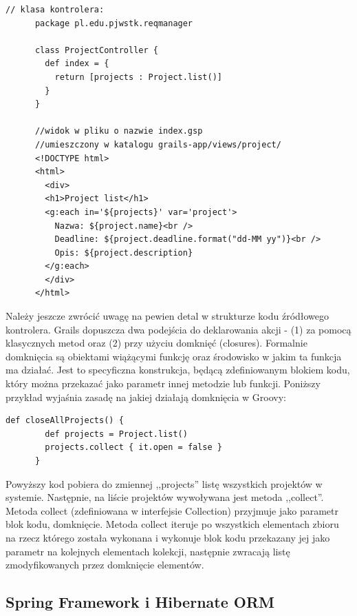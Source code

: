     \begin{lstlisting}[caption={widok i kontroler}, label={lst:contView}]
      // klasa kontrolera:
      package pl.edu.pjwstk.reqmanager

      class ProjectController {
        def index = { 
          return [projects : Project.list()]
        }   
      }

      //widok w pliku o nazwie index.gsp 
      //umieszczony w katalogu grails-app/views/project/
      <!DOCTYPE html>
      <html>
        <div>
        <h1>Project list</h1>
        <g:each in='${projects}' var='project'>
          Nazwa: ${project.name}<br />
          Deadline: ${project.deadline.format("dd-MM yy")}<br />
          Opis: ${project.description} 
        </g:each>
        </div>
      </html>

    \end{lstlisting}

    Należy jeszcze zwrócić uwagę na pewien detal w strukturze kodu źródłowego kontrolera. Grails dopuszcza dwa podejścia do deklarowania akcji - (1) za pomocą klasycznych metod oraz (2) przy użyciu domknięć (closures). Formalnie domknięcia są obiektami wiążącymi funkcję oraz środowisko w jakim ta funkcja ma działać. Jest to specyficzna konstrukcja, będącą zdefiniowanym blokiem kodu, który można przekazać jako parametr innej metodzie lub funkcji. Poniższy przykład wyjaśnia zasadę na jakiej działają domknięcia w Groovy: 
    
    \begin{lstlisting}[caption={domknięcie w Groovy}, label={lst:closure}]
      def closeAllProjects() {
        def projects = Project.list()
        projects.collect { it.open = false }
      }
    \end{lstlisting} 
    
    Powyższy kod pobiera do zmiennej ,,projects'' listę wszystkich projektów w systemie. Następnie, na liście projektów wywoływana jest metoda ,,collect''. Metoda collect (zdefiniowana w interfejsie Collection) przyjmuje jako parametr blok kodu, domknięcie. Metoda collect iteruje po wszystkich elementach zbioru na rzecz którego została wykonana i wykonuje blok kodu przekazany jej jako parametr na kolejnych elementach kolekcji, następnie zwracają listę zmodyfikowanych przez domknięcie elementów.

    \subsection{Spring Framework i Hibernate ORM}

